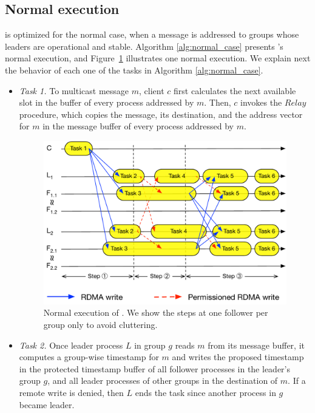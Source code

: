 \subsection{Normal execution}
\label{sec:normalcase}

\libname is optimized for the normal case, when a message is addressed to groups whose leaders are operational and stable.
Algorithm \ref{alg:normal_case} presents \libname's normal execution, and 
Figure~\ref{fig:normal_operation_time} illustrates one normal execution.
We explain next the behavior of each one of the tasks in Algorithm \ref{alg:normal_case}.

\begin{itemize}
\item \emph{Task 1.} To multicast message $m$, client $c$ first calculates the next available slot in the buffer of every process addressed by $m$. Then, $c$ invokes the $Relay$ procedure, which copies the message, its destination, and the address vector for $m$ in the message buffer of every process addressed by $m$.

\begin{figure}[ht!]
  \centering
  \includegraphics[width=1\linewidth]{figures/execution}
  \caption{Normal execution of \libname. We show the steps at one follower per group only to avoid cluttering.}
  \label{fig:normal_operation_time}
\end{figure}

\item \emph{Task 2.} Once leader process $L$ in group $g$ reads $m$ from its message buffer, it computes a
group-wise timestamp for $m$ and writes the proposed timestamp 
in the protected timestamp buffer of all follower processes in the leader's group $g$, and all leader processes 
of other groups in the destination of $m$.
If a remote write is denied, then $L$ ends the task since another process in $g$ became leader.


\end{itemize}
